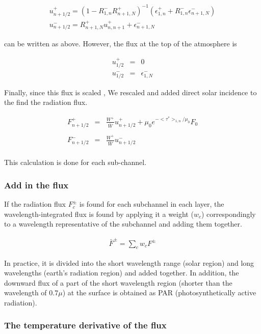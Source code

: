 \begin{eqnarray}
 u^+_{n+1/2} = (1-R^-_{1,n} R^+_{n+1,N})^{-1}
    (\epsilon^+_{1,n} + R^-_{1,n} \epsilon^-_{n+1,N} ) \\
 u^-_{n+1/2} = R^+_{n+1,N}  u^+_{n,n+1} + \epsilon^-_{n+1,N}
\end{eqnarray}

can be written as above. However, the flux at the top of the atmosphere is

\begin{eqnarray}
 u^+_{1/2} & = & 0 \\
 u^-_{1/2} & = & \epsilon^-_{1,N}
\end{eqnarray}

Finally, since this flux is scaled , We rescaled and added direct solar
incidence to the find the radiation flux.

\begin{eqnarray}
  F^+_{n+1/2} & = & \frac{W^+}{\bar{W}} u^+_{n+1/2} 
                + \mu_0 e^{-<\tau^*>_{1,n}/\mu_0} F_0 \\\\
  F^-_{n+1/2} & = & \frac{W^+}{\bar{W}} u^-_{n+1/2} \\
\end{eqnarray}


This calculation is done for each sub-channel.

\hypertarget{add-in-the-flux}{%
\subsubsection{Add in the flux}\label{add-in-the-flux}}

If the radiation flux \(F^\pm_c\) is found for each subchannel in each
layer,  the wavelength-integrated flux is found by applying it a weight 
(\(w_c\)) correspondingly to a wavelength representative of the subchannel 
and adding them together.

\begin{eqnarray}
  \bar{F}^\pm = \sum_c w_c F^\pm
\end{eqnarray}

In practice, it is divided into the short wavelength range (solar region) and 
long wavelengths (earth's radiation region) and added together. 
In addition, the downward flux of a part of the short wavelength region 
(shorter than the wavelength of \(0.7\mu\)) at the surface is obtained
as PAR (photosynthetically active radiation).

\hypertarget{the-temperature-derivative-of-the-flux}{%
\subsubsection{The temperature derivative of the
flux}\label{the-temperature-derivative-of-the-flux}}

